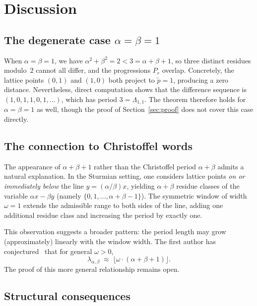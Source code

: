 \documentclass[11pt]{article}
\theoremstyle{plain}
\theoremstyle{definition}
\theoremstyle{remark}
\begin{document}
\section{Discussion}\label{sec:discussion}

\subsection{The degenerate case $\alpha = \beta = 1$}\label{subsec:degenerate}

When $\alpha = \beta = 1$, we have $\alpha^2+\beta^2 = 2 < 3 = \alpha+\beta+1$,
so three distinct residues modulo~$2$ cannot all differ, and the
progressions $P_r$ overlap.
Concretely, the lattice points $(0,1)$ and $(1,0)$ both project to
$\tilde{p} = 1$, producing a zero distance.
Nevertheless, direct computation shows that the difference sequence is
$(1, 0, 1, 1, 0, 1, \ldots)$, which has period $3 = \Lambda_{1,1}$.
The theorem therefore holds for $\alpha = \beta = 1$ as well, though the proof
of Section~\ref{sec:proof} does not cover this case directly.

\subsection{The connection to Christoffel words}\label{subsec:christoffel_connection}

The appearance of $\alpha + \beta + 1$ rather than the Christoffel period
$\alpha + \beta$ admits a natural explanation.
In the Sturmian setting, one considers lattice points \emph{on or immediately
below} the line $y = (\alpha/\beta)x$, yielding $\alpha+\beta$ residue classes
of the variable $\alpha x - \beta y$ (namely $\{0, 1, \ldots, \alpha+\beta-1\}$).
The symmetric window of width $\omega = 1$ extends the admissible range to both
sides of the line, adding one additional residue class and increasing the period
by exactly one.

This observation suggests a broader pattern: the period length may grow
(approximately) linearly with the window width.  The first author has
conjectured~\cite{Kunert2025conjectures} that for general $\omega > 0$,
\[
    \lambda_{\alpha,\beta}
    \;\approx\;
    \bigl\lfloor \omega \cdot (\alpha+\beta+1) \bigr\rfloor.
\]
The proof of this more general relationship remains open.

\subsection{Structural consequences}
\end{document}
